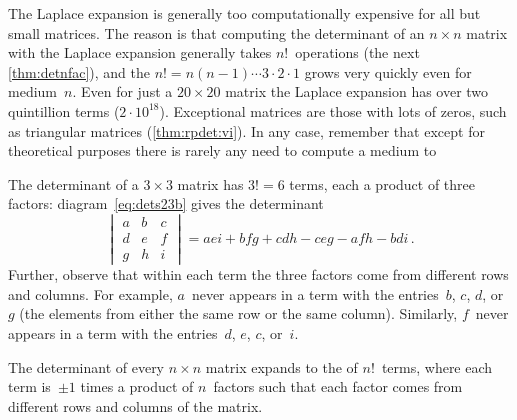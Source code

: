 The Laplace expansion is generally too computationally expensive for all but small matrices.
The reason is that computing the determinant of an \(n\times n\) matrix with the Laplace expansion generally takes \(n!\)~operations (the next \cref{thm:detnfac}), and the  \(n!=n(n-1)\cdots3\cdot2\cdot1\) grows very quickly even for medium~\(n\).
Even for just a \(20\times20\) matrix the Laplace expansion has over two quintillion terms (\(2\cdot10^{18}\)).
Exceptional matrices are those with lots of zeros, such as triangular matrices (\cref{thm:rpdet:vi}).
In any case, remember that except for theoretical purposes there is rarely any need to compute a medium to 



\begin{example} 
The determinant of a \(3\times3\) matrix has \(3!=6\) terms, each a product of three factors:
diagram~\eqref{eq:dets23b} gives the determinant
\begin{equation*}
\begin{vmatrix} a&b&c\\d&e&f\\g&h&i \end{vmatrix}=aei+bfg+cdh-ceg-afh-bdi\,.
\end{equation*}
Further, observe that within each term the three factors come from different rows and columns.
For example, \(a\)~never appears in a term with the entries~\(b\), \(c\), \(d\), or~\(g\) (the elements from either the same row or the same column).
Similarly, \(f\)~never appears in a term with the entries~\(d\), \(e\), \(c\), or~\(i\).
\end{example}



\begin{theorem} \label{thm:detnfac}
The determinant of every \(n\times n\) matrix expands to the  of \(n!\)~terms, where each term is~\(\pm1\) times a product of \(n\)~factors such that each factor comes from different rows and columns of the matrix.
\end{theorem}

